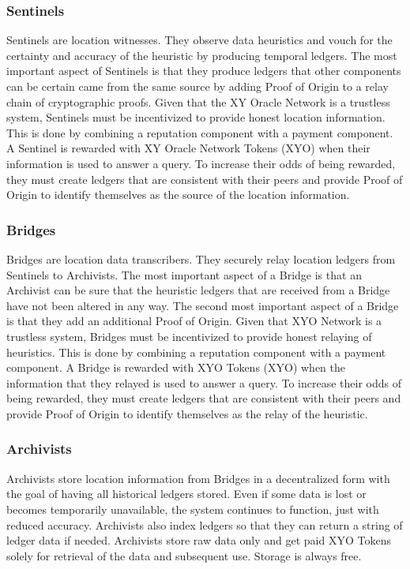 \documentclass{article}
\begin{document}
\subsubsection{Sentinels}

Sentinels are location witnesses. They observe data heuristics and vouch for the certainty and
accuracy of the heuristic by producing temporal ledgers. The most important aspect of
Sentinels is that they produce ledgers that other components can be certain came from the same source
by adding Proof of Origin to a relay chain of cryptographic proofs.
Given that the XY Oracle Network is a trustless system, Sentinels must be incentivized to
provide honest location information. This is done by combining a reputation component with a
payment component. A Sentinel is rewarded with XY Oracle Network Tokens (XYO) when
their information is used to answer a query. To increase their odds of being rewarded,
they must create ledgers that are consistent with their peers and provide Proof of
Origin to identify themselves as the source of the location information.

\subsubsection{Bridges}

Bridges are location data transcribers. They securely relay location ledgers from Sentinels to Archivists. The most important aspect of a Bridge is that an Archivist can be sure that the heuristic ledgers that are received from a Bridge have not been altered in any way. The second most important aspect of a Bridge is that they add an additional Proof of Origin. Given that XYO Network is a trustless system, Bridges must be incentivized to provide honest relaying of heuristics. This is done by combining a reputation component with a payment component. A Bridge is rewarded with XYO Tokens (XYO) when the information that they relayed is used to answer a query. To increase their odds of being rewarded, they must create ledgers that are consistent with their peers and provide Proof of Origin to identify themselves as the relay of the heuristic.

\subsubsection{Archivists}

Archivists store location information from Bridges in a decentralized form with the goal of having all historical ledgers stored. Even if some data is lost or becomes temporarily unavailable, the system continues to function, just with reduced accuracy. Archivists also index ledgers so that they can return a string of ledger data if needed. Archivists store raw data only and get paid XYO Tokens solely for retrieval of the data and subsequent use. Storage is always free.
\end{document}
